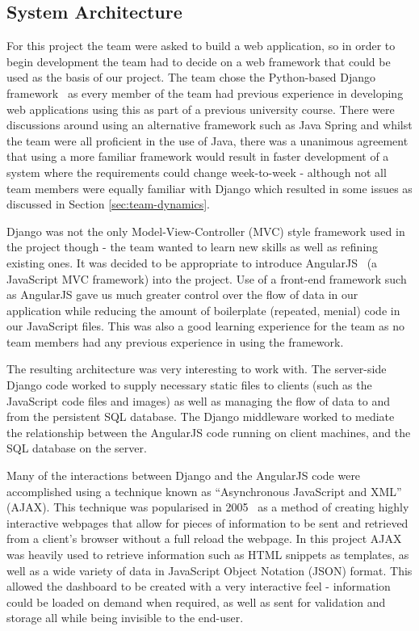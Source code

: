 \documentclass{l3proj}
\begin{document}
\subsection{System Architecture}
\label{sec:system-implementation:system-architecture}

For this project the team were asked to build a web application, so in order to begin development the team had to decide on a web framework that could be used as the basis of our project. The team chose the Python-based Django framework~\cite{Django} as every member of the team had previous experience in developing web applications using this as part of a previous university course. There were discussions around using an alternative framework such as Java Spring and whilst the team were all proficient in the use of Java, there was a unanimous agreement that using a more familiar framework would result in faster development of a system where the requirements could change week-to-week - although not all team members were equally familiar with Django which resulted in some issues as discussed in Section \ref{sec:team-dynamics}.

Django was not the only Model-View-Controller (MVC) style framework used in the project though - the team wanted to learn new skills as well as refining existing ones. It was decided to be appropriate to introduce AngularJS~\cite{AngularWebpage} (a JavaScript MVC framework) into the project. Use of a front-end framework such as AngularJS gave us much greater control over the flow of data in our application while reducing the amount of boilerplate (repeated, menial) code in our JavaScript files. This was also a good learning experience for the team as no team members had any previous experience in using the framework.

The resulting architecture was very interesting to work with. The server-side Django code worked to supply necessary static files to clients (such as the JavaScript code files and images) as well as managing the flow of data to and from the persistent SQL database. The Django middleware worked to mediate the relationship between the AngularJS code running on client machines, and the SQL database on the server.

Many of the interactions between Django and the AngularJS code were accomplished using a technique known as ``Asynchronous JavaScript and XML'' (AJAX). This technique was popularised in 2005~\cite{ANewApproachToWebApplications, W3CAjaxProposal} as a method of creating highly interactive webpages that allow for pieces of information to be sent and retrieved from a client's browser without a full reload the webpage. In this project AJAX was heavily used to retrieve information such as HTML snippets as templates, as well as a wide variety of data in JavaScript Object Notation (JSON) format. This allowed the dashboard to be created with a very interactive feel - information could be loaded on demand when required, as well as sent for validation and storage all while being invisible to the end-user.
\end{document}
